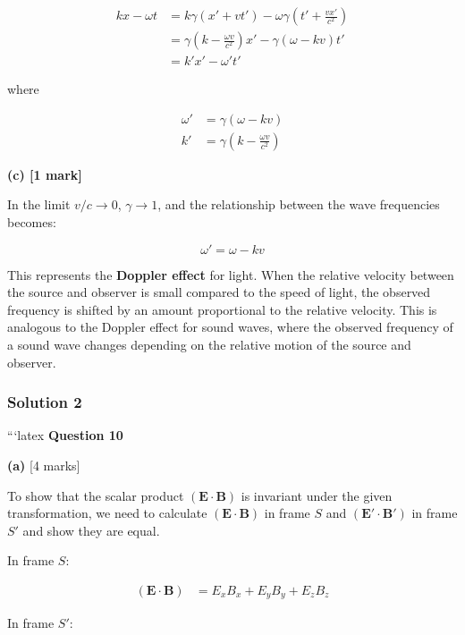 \documentclass{article}
\begin{document}
\begin{align*}
kx - \omega t &= k \gamma (x' + vt') - \omega \gamma \left( t' + \frac{vx'}{c^2} \right) \\
&= \gamma \left( k - \frac{\omega v}{c^2} \right) x' - \gamma (\omega - kv) t' \\
&= k'x' - \omega' t'
\end{align*}

where

\begin{align*}
\omega' &= \gamma (\omega - k v) \\
k' &= \gamma \left( k - \frac{\omega v}{c^2} \right)
\end{align*}


\textbf{(c) [1 mark]}

In the limit $v/c \to 0$, $\gamma \to 1$, and the relationship between the wave frequencies becomes:

\[\omega' = \omega - kv\]

This represents the \textbf{Doppler effect} for light. When the relative velocity between the source and observer is small compared to the speed of light, the observed frequency is shifted by an amount proportional to the relative velocity. This is analogous to the Doppler effect for sound waves, where the observed frequency of a sound wave changes depending on the relative motion of the source and observer.


\subsubsection{Solution 2}
```latex
\textbf{Question 10}

\textbf{(a)} [4 marks] 

To show that the scalar product $(\mathbf{E} \cdot \mathbf{B})$ is invariant under the given transformation, we need to calculate  $(\mathbf{E} \cdot \mathbf{B})$ in frame $S$ and $(\mathbf{E'} \cdot \mathbf{B'})$ in frame $S'$ and show they are equal.

In frame $S$:

\begin{align*}
(\mathbf{E} \cdot \mathbf{B}) &= E_x B_x + E_y B_y + E_z B_z
\end{align*}

In frame $S'$:
\end{document}
